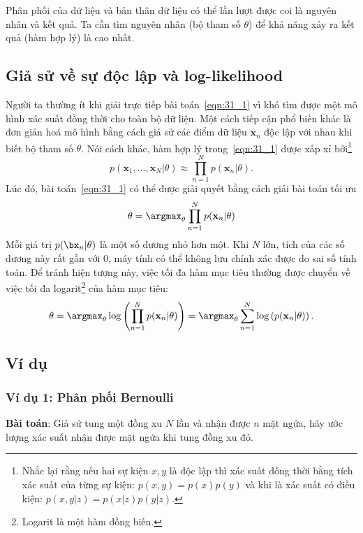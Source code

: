 Phân phối của dữ liệu và bản thân dữ liệu có thể lần lượt được coi là nguyên nhân và kết quả. Ta cần tìm nguyên nhân (bộ tham số $\theta$) để khả năng xảy ra kết quả (hàm hợp lý) là cao nhất.

 
\subsection{Giả sử về sự độc lập và log-likelihood}
Người ta thường ít khi giải trực tiếp bài toán~\eqref{eqn:31_1} vì khó tìm được
một mô hình xác suất đồng thời cho toàn bộ dữ liệu. Một cách tiếp cận phổ biến
khác là đơn giản hoá mô hình bằng cách giả sử các điểm dữ liệu $\mathbf{x}_n$
độc lập với nhau khi biết bộ tham số $\theta$. Nói cách khác, hàm hợp lý trong~\eqref{eqn:31_1} được xấp xỉ
bởi\footnote{Nhắc lại rằng nếu hai sự kiện $x, y$ là độc lập thì xác suất đồng thời bằng tích xác suất của từng sự kiện: $p(x, y) = p(x)p(y)$ và khi là
xác suất có điều kiện: $p(x, y | z) = p(x|z)p(y|z)$.}
\begin{equation} 
\label{eqn:31_2}
p(\mathbf{x}_1, \dots, \mathbf{x}_N | \theta) \approx \prod_{n = 1}^N p(\mathbf{x}_n |\theta).
\end{equation} 
 Lúc đó, bài toán~\eqref{eqn:31_1}
có thể được giải quyết bằng cách giải bài toán tối ưu 
\begin{equation} 
\label{eqn:31_3}
\theta = \argmax_{\theta} \prod_{n=1}^N p(\mathbf{x}_n| \theta) 
\end{equation} 
Mỗi giá trị $p(\bx_n |\theta)$ là một số dương nhỏ hơn một. Khi $N$ lớn, tích của các số dương này rất gần với 0, máy tính có thể không lưu chính xác được do sai số tính toán. Để tránh hiện tượng này, việc tối đa hàm mục tiêu thường được chuyển về việc tối đa logarit\footnote{Logarit là một hàm đồng biến.} của hàm mục tiêu:
\begin{equation} 
\label{eqn:31_4}
\theta = \argmax_{\theta} \log\left(\prod_{n=1}^N p(\mathbf{x}_n| \theta)\right) = \argmax_{\theta} \sum_{n = 1}^N \log\left(p(\mathbf{x}_n | \theta)
\right).
\end{equation} 


 
 
\subsection{Ví dụ}
 
\subsubsection{Ví dụ 1: Phân phối Bernoulli}
\textbf{Bài toán}: Giả sử tung một đồng xu $N$ lần và nhận được $n$ mặt
ngửa, hãy ước lượng xác suất nhận được mặt ngửa khi tung đồng xu đó.
 
